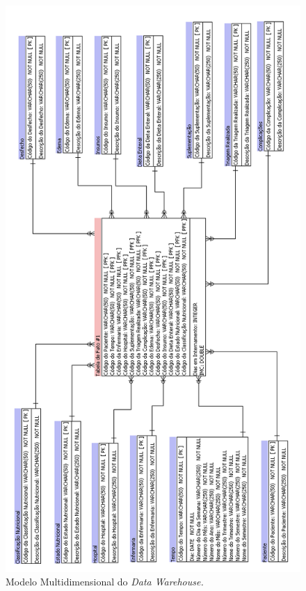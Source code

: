 \begin{figure}[htb]
	\caption{\label{fig_modelagemdatawarehouse}Modelo Multidimensional do \textit{Data Warehouse.}}
	\begin{center}
	    \includegraphics[scale=0.5798]{Imagens/figura - modelagem multidimensional datawarehouse.png}
	\end{center}
\end{figure}

